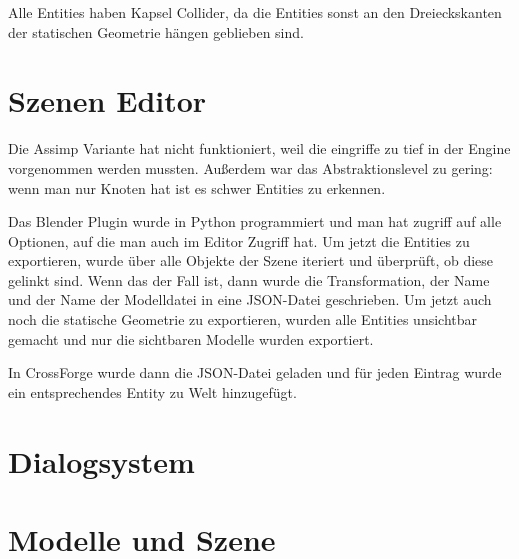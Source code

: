 Alle Entities haben Kapsel Collider, da die Entities sonst an den Dreieckskanten der statischen Geometrie hängen geblieben sind.

\section{Szenen Editor}

Die Assimp Variante hat nicht funktioniert, weil die eingriffe zu tief in der Engine vorgenommen werden mussten. Außerdem war das Abstraktionslevel zu gering: wenn man nur Knoten hat ist es schwer Entities zu erkennen.

Das Blender Plugin wurde in Python programmiert und man hat zugriff auf alle Optionen, auf die man auch im Editor Zugriff hat. Um jetzt die Entities zu exportieren, wurde über alle Objekte der Szene iteriert und überprüft, ob diese gelinkt sind. Wenn das der Fall ist, dann wurde die Transformation, der Name und der Name der Modelldatei in eine JSON-Datei geschrieben. Um jetzt auch noch die statische Geometrie zu exportieren, wurden alle Entities unsichtbar gemacht und nur die sichtbaren Modelle wurden exportiert.

In CrossForge wurde dann die JSON-Datei geladen und für jeden Eintrag wurde ein entsprechendes Entity zu Welt hinzugefügt.

\section{Dialogsystem}

\section{Modelle und Szene}

